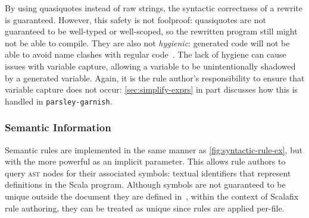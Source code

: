 \documentclass[../../main.tex]{subfiles}
\begin{document}
\noindent %
By using quasiquotes instead of raw strings, the syntactic correctness of a rewrite is guaranteed.
However, this safety is not foolproof: quasiquotes are not guaranteed to be well-typed or well-scoped, so the rewritten program still might not be able to compile.
They are also not \emph{hygienic}: generated code will not be able to avoid name clashes with regular code~\cite{burmako_scalameta_2017}.
The lack of hygiene can cause issues with variable capture, allowing a variable to be unintentionally shadowed by a generated variable.
Again, it is the rule author's responsibility to ensure that variable capture does not occur: \cref{sec:simplify-exprs} in part discusses how this is handled in \texttt{parsley-garnish}.

\subsubsection{Semantic Information}
Semantic rules are implemented in the same manner as \cref{fig:syntactic-rule-ex}, but with the more powerful  as an implicit parameter.
This allows rule authors to query \textsc{ast} nodes for their associated symbols: textual identifiers that represent definitions in the Scala program.
Although symbols are not guaranteed to be unique outside the document they are defined in~\cite{scalameta_semanticdb_spec_2023}, within the context of Scalafix rule authoring, they can be treated as unique since rules are applied per-file.
\end{document}
